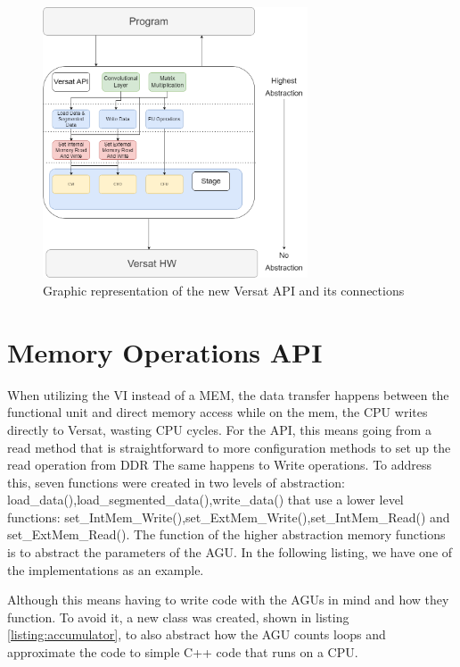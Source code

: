 \begin{figure}[!htbp]
    \centering
    \includegraphics[width=0.7\textwidth]{Figures/VersatMemory.drawio.png}
    \caption{Graphic representation of the new Versat API and its connections}
    \label{newAPI}
\end{figure} 


\section{Memory Operations API}

When utilizing the VI instead of a MEM, the data transfer happens between the functional unit and direct memory access while
on the mem, the CPU writes directly to Versat, wasting CPU cycles. For the API, this means going from a read method that is straightforward
to more configuration methods to set up the read operation from DDR The same happens to Write operations. To address this, seven functions were created in two levels of abstraction:
load\_data(),load\_segmented\_data(),write\_data() that use a lower level functions: set\_IntMem\_Write(),set\_ExtMem\_Write(),set\_IntMem\_Read() and set\_ExtMem\_Read().
The function of the higher abstraction memory functions is to abstract the parameters of the AGU. In the following listing, we have one of the implementations
as an example.




Although this means having to write code with the AGUs in mind
and how they function. To avoid it, a new class was created, shown in listing \ref*{listing:accumulator},
to also abstract how the AGU counts loops and approximate 
the code to simple C++ code that runs on a CPU.

